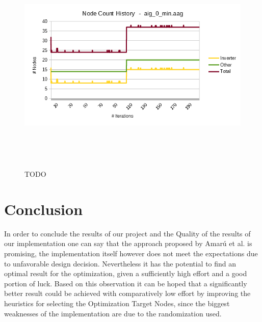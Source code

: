 \documentclass[
	accentcolor=1c,%
	type=intern,
	marginpar=false,
	ruledheaders=section,
	class=report,
	BCOR=5mm,
      parskip=half-,
	fontsize=10pt
	]{tudapub}
\begin{document}
\begin{figure}[!ht]
				\begin{minipage}{\textwidth}
					\centering
					\begin{minipage}{.45\textwidth}
						\includegraphics[width=\textwidth]{images/eval_6.png}
						\caption{TODO}
						\label{fig_6}
					\end{minipage}\\
				\end{minipage}\\[1em]
			\end{figure}

	\section{Conclusion}
	In order to conclude the results of our project and the Quality of the results of our implementation one can say that the approach proposed by Amarú et al. is promising, the implementation itself however does not meet the expectations due to unfavorable design decision.
	Nevertheless it has the potential to find an optimal result for the optimization, given a sufficiently high effort and a good portion of luck.
	Based on this observation it can be hoped that a significantly better result could be achieved with comparatively low effort by improving the heuristics for selecting the Optimization Target Nodes, since the biggest weaknesses of the implementation are due to the randomization used.
\end{document}
